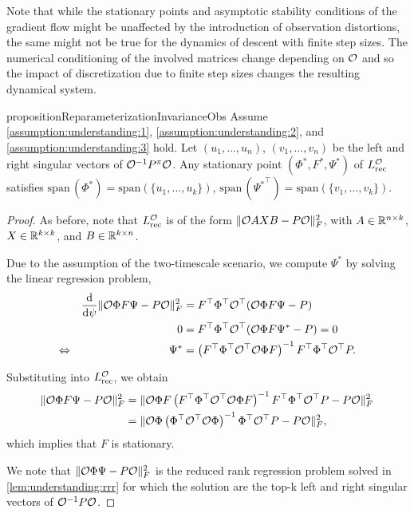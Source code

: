 Note that while the stationary points and asymptotic stability conditions of the gradient flow might be unaffected by the introduction of observation distortions, the same might not be true for the dynamics of descent with finite step sizes.
The numerical conditioning of the involved matrices change depending on ${\mathcal{O}}$ and so the impact of discretization due to finite step sizes changes the resulting dynamical system.

\begin{restatable}{proposition}{ReparameterizationInvarianceObs} 
 Assume \autoref{assumption:understanding:1}, \autoref{assumption:understanding:2}, and \autoref{assumption:understanding:3} hold. Let $(u_1,\dots,\allowbreak u_n)$, $(v_1,\dots,v_n)$ be the left and right singular vectors of ${\mathcal{O}}^{-1}P^\pi{\mathcal{O}}$. 
Any stationary point $(\Phi^*, F^*, \Psi^*)$ of $L_\text{rec}^{\mathcal{O}}$ satisfies $\mathrm{span}\,(\Phi^*)=\mathrm{span}\left(\{u_1,\dots,u_k\}\right)$, $\mathrm{span}\,({\Psi^*}^\top)=\mathrm{span}(\{v_1,\dots,\allowbreak v_k\})$.
\end{restatable}
\begin{proof}
    
As before, note that $L_\mathrm{rec}^{\mathcal{O}}$ is of the form $\lVert {\mathcal{O}} AXB - P{\mathcal{O}} \rVert_F^2$, with $A \in \mathbb{R}^{n \times k}$, $X \in \mathbb{R}^{k \times k}$, and $B \in \mathbb{R}^{k \times n}$.

Due to the assumption of the two-timescale scenario, we compute $\Psi^*$ by solving the linear regression problem,
\begin{align}
    &&\frac{\mathrm{d}}{\mathrm{d} \psi} \lVert {\mathcal{O}} \Phi F \Psi - P {\mathcal{O}} \rVert_F^2 &= F^\top \Phi^\top {\mathcal{O}}^\top ({\mathcal{O}} \Phi F \Psi - P)\\
    &&0 &=  F^\top \Phi^\top {\mathcal{O}}^\top ({\mathcal{O}} \Phi F \Psi^* - P) = 0 \\
    \Leftrightarrow &&
    \Psi^* &= \left(F^\top \Phi^\top {\mathcal{O}}^\top {\mathcal{O}} \Phi F\right)^{-1} F^\top \Phi^\top {\mathcal{O}}^\top P.
\end{align}

Substituting into $L_\mathrm{rec}^{\mathcal{O}}$, we obtain
\begin{align}
    \lVert {\mathcal{O}} \Phi F \Psi- P {\mathcal{O}} \rVert_F^2 & = \lVert {\mathcal{O}} \Phi F \left(F^\top \Phi^\top {\mathcal{O}}^\top {\mathcal{O}} \Phi F\right)^{-1} F^\top \Phi^\top {\mathcal{O}}^\top P - P{\mathcal{O}} \rVert_F^2 \\
    & = \lVert {\mathcal{O}} \Phi \left( \Phi^\top {\mathcal{O}}^\top {\mathcal{O}} \Phi\right)^{-1} \Phi^\top {\mathcal{O}}^\top P - P{\mathcal{O}} \rVert_F^2,
\end{align}
which implies that $F$ is stationary.

We note that $\lVert {\mathcal{O}} \Phi\Psi - P{\mathcal{O}}\rVert^2_F$ is the reduced rank regression problem solved in \autoref{lem:understanding:rrr} for which the solution are the top-k left and right singular vectors of ${\mathcal{O}}^{-1} P {\mathcal{O}}$.
\end{proof}


